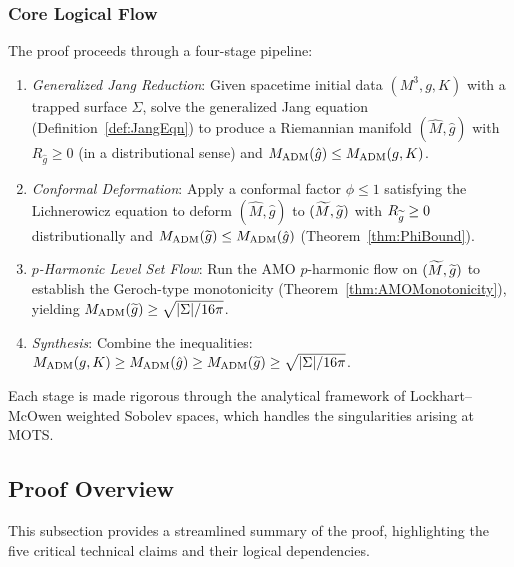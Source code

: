 \subsubsection*{Core Logical Flow}
The proof proceeds through a four-stage pipeline:
\begin{enumerate}
    \item[\textbf{Stage 1.}] \emph{Generalized Jang Reduction}: Given spacetime initial data $(M^3, g, K)$ with a trapped surface $\Sigma$, solve the generalized Jang equation (Definition~\ref{def:JangEqn}) to produce a Riemannian manifold $(\hat{M}, \hat{g})$ with $R_{\hat{g}} \ge 0$ (in a distributional sense) and $M_{\mathrm{ADM}}(\hat{g}) \le M_{\mathrm{ADM}}(g,K)$.
    
    \item[\textbf{Stage 2.}] \emph{Conformal Deformation}: Apply a conformal factor $\phi \le 1$ satisfying the Lichnerowicz equation to deform $(\hat{M}, \hat{g})$ to $(\widetilde{M}, \widetilde{g})$ with $R_{\widetilde{g}} \ge 0$ distributionally and $M_{\mathrm{ADM}}(\widetilde{g}) \le M_{\mathrm{ADM}}(\hat{g})$ (Theorem~\ref{thm:PhiBound}).
    
    \item[\textbf{Stage 3.}] \emph{$p$-Harmonic Level Set Flow}: Run the AMO $p$-harmonic flow on $(\widetilde{M}, \widetilde{g})$ to establish the Geroch-type monotonicity (Theorem~\ref{thm:AMOMonotonicity}), yielding $M_{\mathrm{ADM}}(\widetilde{g}) \ge \sqrt{|\Sigma|/16\pi}$.
    
    \item[\textbf{Stage 4.}] \emph{Synthesis}: Combine the inequalities: $M_{\mathrm{ADM}}(g,K) \ge M_{\mathrm{ADM}}(\hat{g}) \ge M_{\mathrm{ADM}}(\widetilde{g}) \ge \sqrt{|\Sigma|/16\pi}$.
\end{enumerate}
Each stage is made rigorous through the analytical framework of Lockhart--McOwen weighted Sobolev spaces, which handles the singularities arising at MOTS.

\subsection{Proof Overview}\label{sec:ExpertOverview}

This subsection provides a streamlined summary of the proof, highlighting the five critical technical claims and their logical dependencies.


